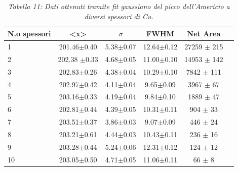 \documentclass[a4paper]{article}
\begin{document}
 
\begin{table}[H]
	
		\begin{tabular}{lccccc}
			\hline
			\hline
			\textbf{N.o spessori} & \textbf{<x>}  &   \textbf{$\sigma$} &\textbf{FWHM}   & \textbf{Net Area}	\\
			\hline
			\hline
				      1 &  201.46$\pm$0.40   & 5.38$\pm$0.07 &  12.64$\pm$0.12 &  27259	$\pm$	215	\\
				      2 &  202.38 $\pm$0.33  & 4.68$\pm$0.05 & 11.00$\pm$0.10	&  14953	$\pm$	142 \\
				      3 &  202.83$\pm$0.26	& 4.38$\pm$0.04 & 10.29$\pm$0.10	&  7842		$\pm$	111 \\
				      4 &  202.97$\pm$0.42	& 4.11$\pm$0.04 & 9.65$\pm$0.09	&  3967	$\pm$	67 \\
				      5 &  203.16$\pm$0.33	& 4.19$\pm$0.04 & 9.84$\pm$0.10	&  1889	$\pm$	47 \\
				      6 &  202.81$\pm$0.44	& 4.39$\pm$0.05 & 10.31$\pm$0.11	&  904	$\pm$	33 \\
				      7 &  203.51$\pm$0.37	& 3.86$\pm$0.03 & 9.07$\pm$0.09	&  446	$\pm$	24 \\
				      8 &  203.21$\pm$0.61	& 4.44$\pm$0.03 & 10.43$\pm$0.11	&  236	$\pm$	16 \\
				      9 &  203.28$\pm$0.44	& 5.24$\pm$0.06 & 12.31$\pm$0.12	&  124	$\pm$	12 \\
				      10 & 203.05$\pm$0.50	& 4.71$\pm$0.05 & 11.06$\pm$0.11	&  66	$\pm$	8 \\
			\hline
			\hline
		\end{tabular}
		\linebreak
		\caption{\textit{Tabella 11: Dati ottenuti tramite fit gaussiano del picco dell'Americio a diversi spessori di Cu.}}\label{tab:8} 
	\end{table}	
\end{document}
